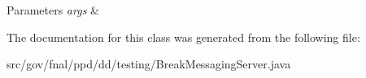 \begin{DoxyParams}{Parameters}
{\em args} & \\
\hline
\end{DoxyParams}


The documentation for this class was generated from the following file\-:\begin{DoxyCompactItemize}
\item 
src/gov/fnal/ppd/dd/testing/Break\-Messaging\-Server.\-java\end{DoxyCompactItemize}

